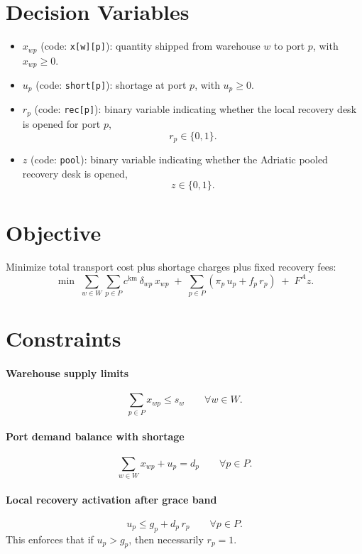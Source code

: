 \section*{Decision Variables}

\begin{itemize}
    \item $x_{wp}$ (code: \texttt{x[w][p]}): quantity shipped from warehouse $w$ to port $p$, with $x_{wp} \ge 0$.
    \item $u_p$ (code: \texttt{short[p]}): shortage at port $p$, with $u_p \ge 0$.
    \item $r_p$ (code: \texttt{rec[p]}): binary variable indicating whether the local recovery desk is opened for port $p$,
    \[
    r_p \in \{0,1\}.
    \]
    \item $z$ (code: \texttt{pool}): binary variable indicating whether the Adriatic pooled recovery desk is opened,
    \[
    z \in \{0,1\}.
    \]
\end{itemize}

\section*{Objective}

Minimize total transport cost plus shortage charges plus fixed recovery fees:
\[
\min \;
\sum_{w \in W}\sum_{p \in P} c^{\mathrm{km}} \,\delta_{wp}\, x_{wp}
\;+\;
\sum_{p \in P}\left(\pi_p\,u_p + f_p\,r_p\right)
\;+\;
F^A z.
\]

\section*{Constraints}

\paragraph{Warehouse supply limits}
\[
\sum_{p \in P} x_{wp} \le s_w
\qquad \forall w \in W.
\]

\paragraph{Port demand balance with shortage}
\[
\sum_{w \in W} x_{wp} + u_p = d_p
\qquad \forall p \in P.
\]

\paragraph{Local recovery activation after grace band}
\[
u_p \le g_p + d_p\, r_p
\qquad \forall p \in P.
\]
This enforces that if $u_p > g_p$, then necessarily $r_p=1$.

